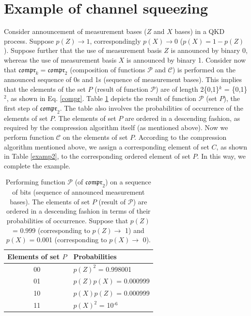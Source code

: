 \documentclass[journal,onecolumn]{IEEEtran}
\theoremstyle{thmstyleone}%
\theoremstyle{thmstyletwo}%
\theoremstyle{thmstylethree}%
\begin{document}
		\section{Example of channel squeezing}
		\label{app2}
		\indent Consider announcement of measurement bases ($Z$ and $X$ bases) in a QKD process. Suppose $p(Z)\rightarrow\text{1}$, correspondingly $p(X)\rightarrow\text{0}$ ($p(X) = \text{1} - p(Z)$). Suppose further that the use of measurement basis $Z$ is announced by binary 0, whereas the use of measurement basis $X$ is announced by binary 1. Consider now that $\mathfrak{compr}_k=\mathfrak{compr}_{\text{2}}$ (composition of functions $\mathcal{P}$ and $\mathcal{C}$) is performed on the announced sequence of 0s and 1s (sequence of measurement bases). This implies that the elements of the set $P$ (result of function $\mathcal{P}$) are of length 2\textemdash \{0,1\}$^k$ = \{0,1\}$^{\text{2}}$, as shown in Eq. \eqref{compr}. Table \ref{examp1} depicts the result of function $\mathcal{P}$ (set $P$), the first step of $\mathfrak{compr}_{\text{2}}$. The table also involves the probabilities of occurrence of the elements of set $P$. The elements of set $P$ are ordered in a descending fashion, as required by the compression algorithm itself (as mentioned above). Now we perform function $\mathcal{C}$ on the elements of set $P$. According to the compression algorithm mentioned above, we assign a corresponding element of set $C$, as shown in Table \ref{examp2}, to the corresponding ordered element of set $P$. In this way, we complete the example.    \\
		\begin{table}[!hbt]
			\centering
			\caption{\label{examp1}%
				Performing function $\mathcal{P}$ (of $\mathfrak{compr}_{\text{2}}$) on a sequence of bits (sequence of announced measurement bases). The elements of set $P$ (result of $\mathcal{P}$) are ordered in a descending fashion in terms of their probabilities of occurrence. Suppose that $p(Z)$ = 0.999 (corresponding to $p(Z)\rightarrow$ 1) and $p(X)$ = 0.001 (corresponding to $p(X)\rightarrow$ 0).}
			
			\begin{tabular}{cl}
				
				\toprule
				Elements of set $P$ & Probabilities \\
				\toprule
				00 & $p(Z)^{\text{2}}$ = 0.998001 \\
				01 & $p(Z)p(X)$ = 0.000999 \\
				10 & $p(X)p(Z)$ = 0.000999 \\
				11 & $p(X)^{\text{2}}$ = 10$^{\text{-6}}$ \\
				\bottomrule
			\end{tabular}
			
		\end{table}
		
\end{document}
